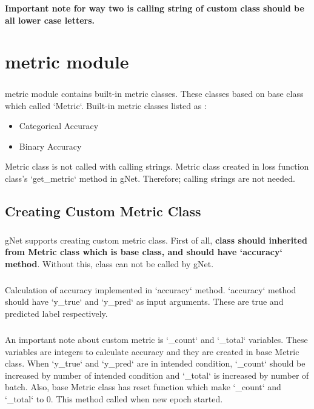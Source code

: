 \documentclass[12pt]{report}
\begin{document}
\textbf{Important note for way two is calling string of custom class should be all lower case letters. }





\chapter{metric module}
\label{ch:metric}

\paragraph{}
metric module contains built-in metric classes. These classes based on base class which called `Metric`. Built-in metric classes listed as : 

\begin{itemize}
	\item	Categorical Accuracy
	\item	Binary Accuracy
\end{itemize}

Metric class is not called with calling strings. Metric class created in loss function class's `get\_metric` method in gNet. Therefore; calling strings are not needed. 

\section{Creating Custom Metric Class}

\paragraph{}
gNet supports creating custom metric class. First of all, \textbf{class should inherited from Metric class which is base class, and should have `accuracy` method}. Without this, class can not be called by gNet. 

\paragraph{}
Calculation of accuracy implemented in `accuracy` method. `accuracy` method should have `y\_true` and `y\_pred` as input arguments. These are true and predicted label respectively. 

\paragraph{}
An important note about custom metric is `\_count` and `\_total` variables. These variables are integers to calculate accuracy and they are created in base Metric class. When `y\_true` and `y\_pred` are in intended condition, `\_count` should be increased by number of intended condition and `\_total` is increased by number of batch. Also, base Metric class has reset function which make `\_count` and `\_total` to 0. This method called when new epoch started. 
\end{document}
